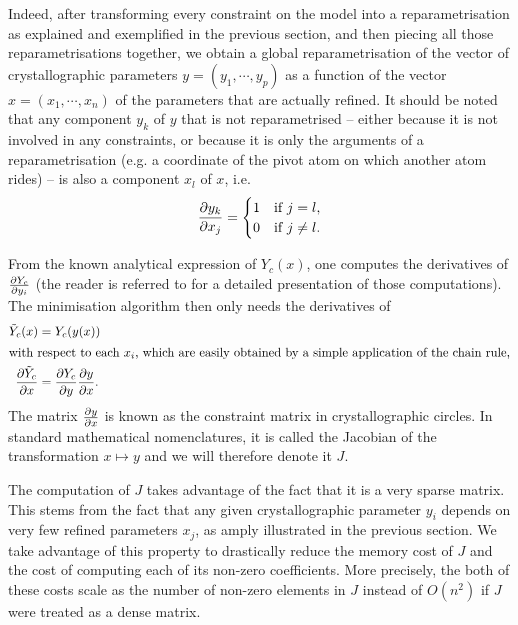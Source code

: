 \documentclass[pdf]{iucr}
\begin{document}
Indeed, after transforming every constraint on the model into a reparametrisation as explained and exemplified in the previous section, and then piecing all those reparametrisations together, we obtain a global reparametrisation of the vector of crystallographic parameters $y = (y_1, \cdots, y_p)$ as a function of the vector $x=(x_1, \cdots, x_n)$ of the parameters that are actually refined. It should be noted that any component $y_k$ of $y$ that is not reparametrised -- either because it is not involved in any constraints, or because it is only the arguments of a reparametrisation (e.g. a coordinate of the pivot atom on which another atom rides) --  is also a component $x_l$ of $x$, i.e. 
\begin{equation}
\frac{\partial y_k}{\partial x_j} = \begin{cases} 
   1& \text{if $j=l$},\\
   0& \text{if $j \neq l$}.
   \end{cases}
\end{equation}

 From the known analytical expression of $Y_c(x)$, one computes the derivatives of $\frac{\partial Y_c}{\partial y_i}$ (the reader is referred to  for a detailed presentation of those computations). The minimisation algorithm then only needs the derivatives of
\begin{align}
\tilde{Y}_c(x) &= Y_c(y(x)) \\
 \intertext{with respect to each $x_i$, which are easily obtained by a simple application of the chain rule,}
\frac{\partial \tilde{Y}_c}{\partial x} &= \frac{\partial Y_c}{\partial y} \frac{\partial y}{\partial x}.
\end{align}
The matrix $\frac{\partial y}{\partial x}$ is known as the constraint matrix in crystallographic circles. In standard mathematical nomenclatures, it is called the Jacobian of the transformation $x \mapsto y$ and we will therefore denote it $J$.

The computation of $J$ takes advantage of the fact that it is a very sparse matrix. This stems from the fact that any given crystallographic parameter $y_i$ depends on very few refined parameters $x_j$, as amply illustrated in the previous section. We take advantage of this property to drastically reduce the memory cost of $J$ and the cost of computing each of its non-zero coefficients. More precisely, the both of these costs scale as the number of non-zero elements in $J$ instead of $O(n^2)$ if $J$ were treated as a dense matrix.
\end{document}
